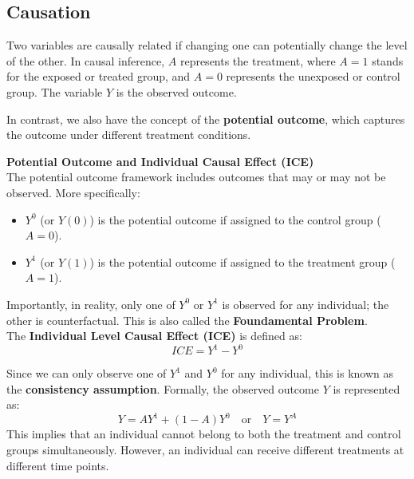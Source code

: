 \subsection{Causation}
Two variables are causally related if changing one can potentially change the level of the other. In causal inference, \( A \) represents the treatment, where \( A=1 \) stands for the exposed or treated group, and \( A=0 \) represents the unexposed or control group. The variable \( Y \) is the observed outcome.

In contrast, we also have the concept of the \textbf{potential outcome}, which captures the outcome under different treatment conditions.
\begin{definition}
    \textbf{Potential Outcome and Individual Causal Effect (ICE)}\\
    The potential outcome framework includes outcomes that may or may not be observed. More specifically:
    \begin{itemize}
        \item \( Y^0 \) (or \( Y(0) \)) is the potential outcome if assigned to the control group (\( A=0 \)).
        \item \( Y^1 \) (or \( Y(1) \)) is the potential outcome if assigned to the treatment group (\( A=1 \)).
    \end{itemize}
    Importantly, in reality, only one of \( Y^0 \) or \( Y^1 \) is observed for any individual; the other is counterfactual. This is also called the \textbf{Foundamental Problem}.\\
    
    The \textbf{Individual Level Causal Effect (ICE)} is defined as:
    \[
    ICE = Y^1 - Y^0
    \]
\end{definition}

Since we can only observe one of \( Y^1 \) and \( Y^0 \) for any individual, this is known as the \textbf{consistency assumption}. Formally, the observed outcome \( Y \) is represented as:
\[
Y = A Y^1 + (1 - A) Y^0 \quad \text{or} \quad Y = Y^A
\]
This implies that an individual cannot belong to both the treatment and control groups simultaneously. However, an individual can receive different treatments at different time points.

